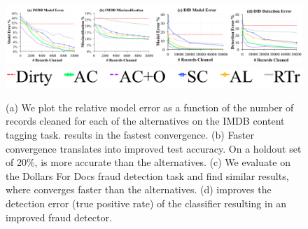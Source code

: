 % 
% 
% 

\begin{figure}[t]
\centering
 \includegraphics[width=\textwidth]{exp/real-experiments-full.png}
 \includegraphics[width=0.6\columnwidth]{exp/legend-real.png}\vspace{-1em}
 \caption{(a) We plot the relative model error as a function of the number of records cleaned for each of the alternatives on the IMDB content tagging task. \sys results in the fastest convergence. (b) Faster convergence translates into improved test accuracy. On a holdout set of 20\%, \sys is more accurate than the alternatives. (c) We evaluate \sys on the Dollars For Docs fraud detection task and find similar results, where \sys converges faster than the alternatives. (d) \sys improves the detection error (true positive rate) of the classifier resulting in an improved fraud detector. \label{real}}\vspace{-1.5em}
\end{figure}

